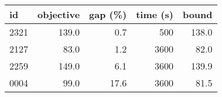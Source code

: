 \begin{tabular}{lrrrr}
\toprule
   id &  objective &  gap (\%) &  time (s) &  bound \\
\midrule
 2321 &      139.0 &      0.7 &       500 &  138.0 \\
 2127 &       83.0 &      1.2 &      3600 &   82.0 \\
 2259 &      149.0 &      6.1 &      3600 &  139.9 \\
 0004 &       99.0 &     17.6 &      3600 &   81.5 \\
\bottomrule
\end{tabular}
